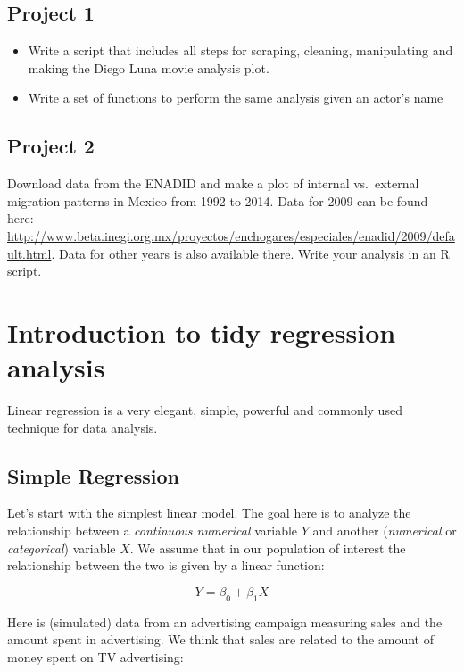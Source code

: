 \documentclass[]{article}
\theoremstyle{definition}
\theoremstyle{definition}
\theoremstyle{remark}
\begin{document}
\subsection{Project 1}\label{project-1}

\begin{itemize}
\item
  Write a script that includes all steps for scraping, cleaning,
  manipulating and making the Diego Luna movie analysis plot.
\item
  Write a set of functions to perform the same analysis given an actor's
  name
\end{itemize}

\subsection{Project 2}\label{project-2}

Download data from the ENADID and make a plot of internal vs.~external
migration patterns in Mexico from 1992 to 2014. Data for 2009 can be
found here:
\url{http://www.beta.inegi.org.mx/proyectos/enchogares/especiales/enadid/2009/default.html}.
Data for other years is also available there. Write your analysis in an
R script.

\section{Introduction to tidy regression
analysis}\label{introduction-to-tidy-regression-analysis}

Linear regression is a very elegant, simple, powerful and commonly used
technique for data analysis.

\subsection{Simple Regression}\label{simple-regression}

Let's start with the simplest linear model. The goal here is to analyze
the relationship between a \emph{continuous numerical} variable \(Y\)
and another (\emph{numerical} or \emph{categorical}) variable \(X\). We
assume that in our population of interest the relationship between the
two is given by a linear function:

\[
Y = \beta_0 + \beta_1 X
\]

Here is (simulated) data from an advertising campaign measuring sales
and the amount spent in advertising. We think that sales are related to
the amount of money spent on TV advertising:
\end{document}
